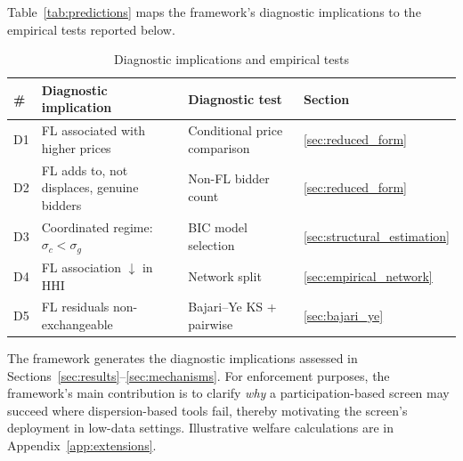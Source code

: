 Table~\ref{tab:predictions} maps the framework's diagnostic
implications to the empirical tests reported below.

\begin{table}[htbp]
\centering
\caption{Diagnostic implications and empirical tests}
\label{tab:predictions}
\small
\begin{tabular}{llll}
\toprule
\# & Diagnostic implication & Diagnostic test & Section \\
\midrule
D1\label{pred:price_v6} & FL associated with higher prices & Conditional price comparison & \ref{sec:reduced_form} \\
D2\label{pred:selection_v6} & FL adds to, not displaces, genuine bidders & Non-FL bidder count & \ref{sec:reduced_form} \\
D3\label{pred:regime_v6} & Coordinated regime: $\sigma_c < \sigma_g$ & BIC model selection & \ref{sec:structural_estimation} \\
D4\label{pred:market_v6} & FL association $\downarrow$ in HHI & Network split & \ref{sec:empirical_network} \\
D5\label{pred:exchange_v6} & FL residuals non-exchangeable & Bajari--Ye KS + pairwise & \ref{sec:bajari_ye} \\
\bottomrule
\end{tabular}
\end{table}

\noindent The framework generates the diagnostic implications assessed
in Sections~\ref{sec:results}--\ref{sec:mechanisms}. For enforcement
purposes, the framework's main contribution is to clarify
\emph{why} a participation-based screen may succeed where
dispersion-based tools fail, thereby motivating the screen's
deployment in low-data settings. Illustrative welfare calculations
are in Appendix~\ref{app:extensions}.

